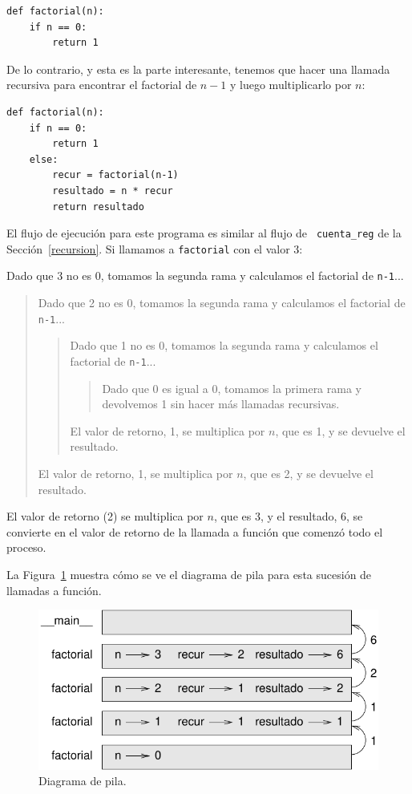 \documentclass[10pt]{book}
\begin{document}
\begin{verbatim}
def factorial(n):
    if n == 0:
        return 1
\end{verbatim}
%
De lo contrario, y esta es la parte interesante, tenemos que hacer una
llamada recursiva para encontrar el factorial de $n-1$ y luego multiplicarlo por
$n$:

\begin{verbatim}
def factorial(n):
    if n == 0:
        return 1
    else:
        recur = factorial(n-1)
        resultado = n * recur
        return resultado
\end{verbatim}
%
El flujo de ejecución para este programa es similar al flujo de {\tt
cuenta\_reg} de la Sección~\ref{recursion}.  Si llamamos a {\tt factorial}
con el valor 3:

Dado que 3 no es 0, tomamos la segunda rama y calculamos el factorial
de {\tt n-1}...

\begin{quote}
Dado que 2 no es 0, tomamos la segunda rama y calculamos el factorial de
{\tt n-1}...


  \begin{quote}
  Dado que 1 no es 0, tomamos la segunda rama y calculamos el factorial
  de {\tt n-1}...


    \begin{quote}
    Dado que 0 es igual a 0, tomamos la primera rama y devolvemos 1
    sin hacer más llamadas recursivas.
    \end{quote}


  El valor de retorno, 1, se multiplica por $n$, que es 1, y se
  devuelve el resultado.
  \end{quote}


El valor de retorno, 1, se multiplica por $n$, que es 2, y se
devuelve el resultado.
\end{quote}


El valor de retorno (2) se multiplica por $n$, que es 3, y el resultado, 6,
se convierte en el valor de retorno de la llamada a función que comenzó todo
el proceso.

La Figura~\ref{fig.stack3} muestra cómo se ve el diagrama de pila
para esta sucesión de llamadas a función.

\begin{figure}
\centerline
{\includegraphics[scale=0.8]{figs/stack3.pdf}}
\caption{Diagrama de pila.}
\label{fig.stack3}
\end{figure}
\end{document}
